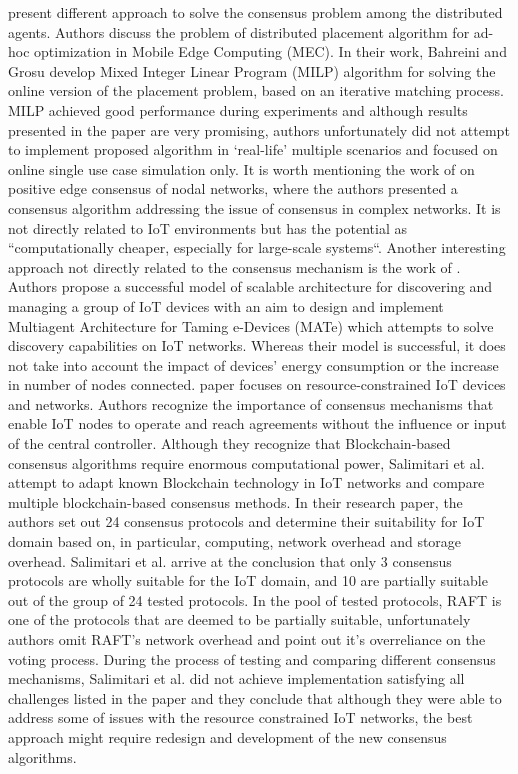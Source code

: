 \documentclass[oneside,12pt]{book}
\begin{document}
\cite{10.1145/3132211.3134454} present different approach to solve the consensus problem among the distributed agents. Authors discuss the problem of distributed placement algorithm for ad-hoc optimization in Mobile Edge Computing (MEC). In their work, Bahreini and Grosu develop Mixed Integer Linear Program (MILP) algorithm for solving the online version of the placement problem, based on an iterative matching process. MILP achieved good performance during experiments and although results presented in the paper are very promising, authors unfortunately did not attempt to implement proposed algorithm in ‘real-life’ multiple scenarios and focused on online single use case simulation only.\smallskip \newline 
It is worth mentioning the work of \cite{CUI20204349} on positive edge consensus of nodal networks, where the authors presented a consensus algorithm addressing the issue of consensus in complex networks. It is not directly related to IoT environments but has the potential as “computationally cheaper, especially for large-scale systems“.\smallskip \newline 
Another interesting approach not directly related to the consensus mechanism is the work of \cite{10.1016/j.jnca.2019.04.017}. Authors propose a successful model of scalable architecture for discovering and managing a group of IoT devices with an aim to design and implement Multiagent Architecture for Taming e-Devices (MATe) which attempts to solve discovery capabilities on IoT networks. Whereas their model is successful, it does not take into account the impact of devices’ energy consumption or the increase in number of nodes connected.\smallskip \newline
\cite{SALIMITARI2020100212} paper focuses on resource-constrained IoT devices and networks. Authors recognize the importance of consensus mechanisms that enable IoT nodes to operate and reach agreements without the influence or input of the central controller. Although they recognize that Blockchain-based consensus algorithms require enormous computational power, Salimitari et al. attempt to adapt known Blockchain technology in IoT networks and compare multiple blockchain-based consensus methods. In their research paper, the authors set out 24 consensus protocols and determine their suitability for IoT domain based on, in particular, computing, network overhead and storage overhead. Salimitari et al. arrive at the conclusion that only 3 consensus protocols are wholly suitable for the IoT domain, and 10 are partially suitable out of the group of 24 tested protocols. In the pool of tested protocols, RAFT is one of the protocols that are deemed to be partially suitable, unfortunately authors omit RAFT’s network overhead and point out it’s overreliance on the voting process. During the process of testing and comparing different consensus mechanisms, Salimitari et al. did not achieve implementation satisfying all challenges listed in the paper and they conclude that although they were able to address some of issues with the resource constrained IoT networks, the best approach might require redesign and development of the new consensus algorithms.\smallskip \newline
\end{document}
